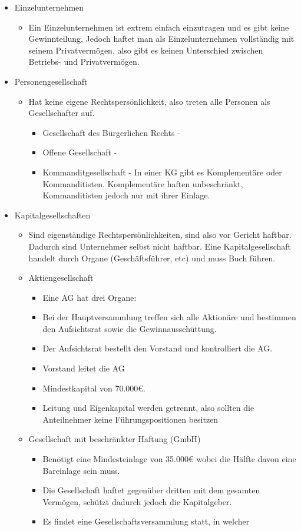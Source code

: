 \documentclass{article}
\begin{document}
	\begin{itemize}
		\item{Einzelunternehmen}
		\begin{itemize}
			\item{Ein Einzelunternehmen ist extrem einfach einzutragen und es gibt keine Gewinnteilung. Jedoch haftet man als Einzelunternehmen vollständig mit seinem Privatvermögen, also gibt es keinen Unterschied zwischen Betriebs- und Privatvermögen.}
		\end{itemize}
		\item{Personengesellschaft}
		\begin{itemize}
			\item{Hat keine eigene Rechtspersönlichkeit, also treten alle Personen als Gesellschafter auf.}
			\begin{itemize}
				\item{Gesellschaft des Bürgerlichen Rechts - }
				\item{Offene Gesellschaft - }
				\item{Kommanditgesellschaft - In einer KG gibt es Komplementäre oder Kommanditisten. Komplementäre haften unbeschränkt, Kommanditisten jedoch nur mit ihrer Einlage.}
			\end{itemize}
		\end{itemize}
		\item{Kapitalgesellschaften}
		\begin{itemize}
			\item{Sind eigenständige Rechtspersönlichkeiten, sind also vor Gericht haftbar. Dadurch sind Unternehmer selbst nicht haftbar. Eine Kapitalgesellschaft handelt durch Organe (Geschäftsführer, etc) und muss Buch führen.}
			\item{Aktiengesellschaft}
			\begin{itemize}
				\item{Eine AG hat drei Organe:}
				\item{Bei der Hauptversammlung treffen sich alle Aktionäre und bestimmen den Aufsichtsrat sowie die Gewinnausschüttung.}
				\item{Der Aufsichtsrat bestellt den Vorstand und kontrolliert die AG.}
				\item{Vorstand leitet die AG}
				\item{Mindestkapital von 70.000€.}
				\item{Leitung und Eigenkapital werden getrennt, also sollten die Anteilnehmer keine Führungspositionen besitzen}
			\end{itemize}
			\item{Gesellschaft mit beschränkter Haftung (GmbH)}
			\begin{itemize}
				\item{Benötigt eine Mindesteinlage von 35.000€ wobei die Hälfte davon eine Bareinlage sein muss.}
				\item{Die Gesellschaft haftet gegenüber dritten mit dem gesamten Vermögen, schützt dadurch jedoch die Kapitalgeber.}
				\item{Es findet eine Gesellschaftsversammlung statt, in welcher }
			\end{itemize}
		\end{itemize}
	\end{itemize}
\end{document}
